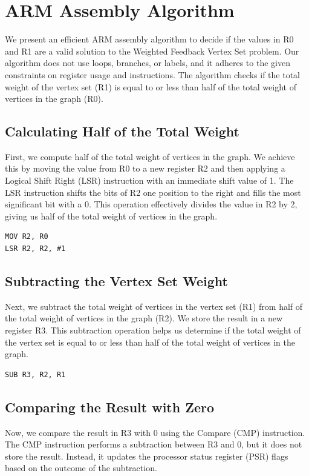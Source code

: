 \section{ARM Assembly Algorithm}
We present an efficient ARM assembly algorithm to decide if the values in R0 and R1 are a valid solution to the Weighted Feedback Vertex Set problem. Our algorithm does not use loops, branches, or labels, and it adheres to the given constraints on register usage and instructions. The algorithm checks if the total weight of the vertex set (R1) is equal to or less than half of the total weight of vertices in the graph (R0).

\subsection{Calculating Half of the Total Weight}
First, we compute half of the total weight of vertices in the graph. We achieve this by moving the value from R0 to a new register R2 and then applying a Logical Shift Right (LSR) instruction with an immediate shift value of 1. The LSR instruction shifts the bits of R2 one position to the right and fills the most significant bit with a 0. This operation effectively divides the value in R2 by 2, giving us half of the total weight of vertices in the graph.

\begin{verbatim}
MOV R2, R0
LSR R2, R2, #1
\end{verbatim}

\subsection{Subtracting the Vertex Set Weight}
Next, we subtract the total weight of vertices in the vertex set (R1) from half of the total weight of vertices in the graph (R2). We store the result in a new register R3. This subtraction operation helps us determine if the total weight of the vertex set is equal to or less than half of the total weight of vertices in the graph.

\begin{verbatim}
SUB R3, R2, R1
\end{verbatim}

\subsection{Comparing the Result with Zero}
Now, we compare the result in R3 with 0 using the Compare (CMP) instruction. The CMP instruction performs a subtraction between R3 and 0, but it does not store the result. Instead, it updates the processor status register (PSR) flags based on the outcome of the subtraction.

